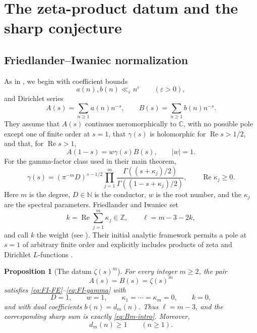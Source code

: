 \documentclass[11pt]{amsart}
\theoremstyle{plain}
\newtheorem{proposition}[theorem]{Proposition}
\theoremstyle{definition}
\theoremstyle{remark}
\newcommand{\C}{\mathbb C}
\newcommand{\Z}{\mathbb Z}
\numberwithin{equation}{section}
\begin{document}
\section{The zeta-product datum and the sharp conjecture}\label{sec:zeta}

\subsection{Friedlander--Iwaniec normalization}

As in \cite{FriedlanderIwaniec}, we begin with coefficient bounds
\[
  a(n),b(n)\ll_\varepsilon n^\varepsilon
  \qquad(\varepsilon>0),
\]
and Dirichlet series
\[
  A(s)=\sum_{n\ge1}a(n)n^{-s},
  \qquad
  B(s)=\sum_{n\ge1}b(n)n^{-s}.
\]
They assume that $A(s)$ continues meromorphically to $\C$, with no possible pole except one of finite order at $s=1$, that $\gamma(s)$ is holomorphic for $\operatorname{Re}s>1/2$, and that, for $\operatorname{Re}s>1$,
\begin{equation}\label{eq:FI-FE}
  A(1-s)=w\gamma(s)B(s),
  \qquad |w|=1.
\end{equation}
For the gamma-factor class used in their main theorem,
\begin{equation}\label{eq:FI-gamma}
  \gamma(s)
  =(\pi^{-m}D)^{s-1/2}
  \prod_{j=1}^{m}
  \frac{\Gamma((s+\kappa_j)/2)}
       {\Gamma((1-s+\kappa_j)/2)},
  \qquad
  \operatorname{Re}\kappa_j\ge0.
\end{equation}
Here $m$ is the degree, $D\in\mathbb N$ is the conductor, $w$ is the root number, and the $\kappa_j$ are the spectral parameters.  Friedlander and Iwaniec set
\[
  k=\operatorname{Re}\sum_{j=1}^{m}\kappa_j\in\Z,
  \qquad
  \ell=m-3-2k,
\]
and call $k$ the weight (see \cite[(1.4)--(1.8)]{FriedlanderIwaniec}).  Their initial analytic framework permits a pole at $s=1$ of arbitrary finite order and explicitly includes products of zeta and Dirichlet $L$-functions \cite[pp.~494--495]{FriedlanderIwaniec}.

\begin{proposition}[The datum $\zeta(s)^m$]\label{prop:zeta-datum}
For every integer $m\ge2$, the pair
\[
  A(s)=B(s)=\zeta(s)^m
\]
satisfies \eqref{eq:FI-FE}--\eqref{eq:FI-gamma} with
\[
  D=1,
  \qquad w=1,
  \qquad \kappa_1=\cdots=\kappa_m=0,
  \qquad k=0,
\]
and with dual coefficients $b(n)=d_m(n)$.  Thus $\ell=m-3$, and the corresponding sharp sum is exactly \eqref{eq:Bm-intro}.  Moreover,
\begin{equation}\label{eq:dm-lower}
  d_m(n)\ge1\qquad(n\ge1).
\end{equation}
\end{proposition}
\end{document}
